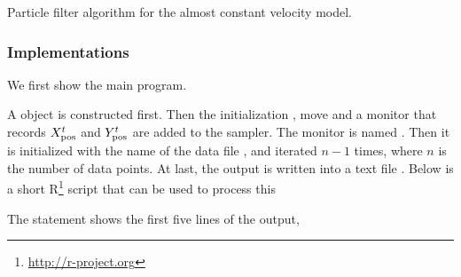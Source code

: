 \begin{algorithm}[t]
  \caption{Particle filter algorithm for the almost constant velocity model.}
  \label{alg:pf}
\end{algorithm}

\subsubsection{Implementations}
\label{ssub:Implementations}

We first show the main program.

A  object is constructed first. Then the
initialization , move  and a monitor
 that records $X_{\mathrm{pos}}^t$ and $Y_{\mathrm{pos}}^t$ are added to the
sampler. The monitor is named . Then it is initialized with
the name of the data file , and iterated $n - 1$ times,
where $n$ is the number of data points. At last, the output is written into a
text file . Below is a short
R\footnote{\url{http://r-project.org}} script that can be used to process this

The  statement shows the first five lines of the output,


